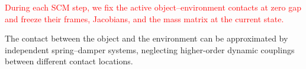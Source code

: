 \begin{assumption}
 \textcolor{red}{During each SCM step, we fix the active object--environment contacts at zero gap  and freeze their frames, Jacobians, and the mass matrix at the current state.}\label{assumption:mode}
\end{assumption}

\begin{assumption}
 The contact between the object and the environment can be approximated by independent spring–damper systems, neglecting higher-order dynamic couplings between different contact locations.  \label{assumption:decoupling}
\end{assumption}

